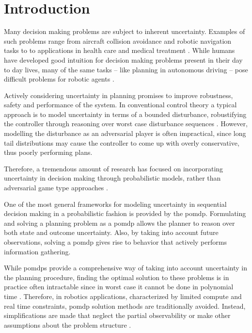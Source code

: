 \chapter{Introduction}\label{chap:introduction}

Many decision making problems are subject to inherent uncertainty. Examples of
such problems range from aircraft collision avoidance and robotic navigation
tasks to to applications in health care and medical treatment
\cite{kochenderfer2012next, bandyopadhyay2013intention, pineau2003towards,
schaefer2005modeling}. While humans have developed good intuition for decision
making problems present in their day to day lives, many of the same tasks --
like planning in autonomous driving -- pose difficult problems for robotic
agents \cite{levinson2011towards}.

Actively considering uncertainty in planning promises to improve robustness,
safety and performance of the system. In conventional control theory a typical
approach is to model uncertainty in terms of a bounded disturbance,
robustifying the controller through reasoning over worst case disturbance
sequences \cite{petersen2012robust}. However, modelling the disturbance as an
adversarial player is often impractical, since long tail distributions may
cause the controller to come up with overly conservative, thus poorly
performing plans.

Therefore, a tremendous amount of research has focused on incorporating
uncertainty in decision making through probabilistic models, rather than
adversarial game type approaches \cite{roy1999coastal, amato2015planning,
fisac2018probabilistically, choudhury2019dynamic}.

One of the most general frameworks for modeling uncertainty in sequential
decision making in a probabilistic fashion is provided by the \ac{pomdp}.
Formulating and solving a planning problem as a \ac{pomdp} allows the planner
to reason over both state and outcome uncertainty. Also, by taking into
account future observations, solving a \ac{pomdp} gives rise to behavior that actively performs information gathering.

While \acp{pomdp} provide a comprehensive way of taking into account
uncertainty in the planning procedure, finding the optimal solution to these
problems is in practice often intractable since in worst case it cannot be
done in polynomial time \cite{papadimitriou1987complexity}. Therefore, in
robotics applications, characterized by limited compute and real time
constraints, \ac{pomdp} solution methods are traditionally avoided. Instead,
simplifications are made that neglect the partial observability or make other
assumptions about the problem structure \cite{sadigh2016information,
fisac2018probabilistically}.

